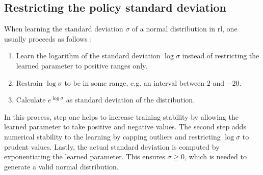 \subsection{Restricting the policy standard deviation}\label{ssec:restricting_stddev}
When learning the standard deviation $\sigma$ of a normal distribution in \gls{rl}, one usually proceeds as follows \cite{schulmanTrustRegionPolicy2017, raffinStableBaselines32019}:
\begin{enumerate}
    \item Learn the logarithm of the standard deviation $\log \sigma$ instead of restricting the learned parameter to positive ranges only.
    \item Restrain $\log \sigma$ to be in some range, e.g. an interval between $2$ and $-20$.
    \item Calculate $e^{\log \sigma}$ as standard deviation of the distribution.
\end{enumerate}
In this process, step one helps to increase training stability by allowing the learned parameter to take positive and negative values. The second step adds numerical stability to the learning by capping outliers and restricting $\log \sigma$ to prudent values. Lastly, the actual standard deviation is computed by exponentiating the learned parameter. This ensures $\sigma \geq 0$, which is needed to generate a valid normal distribution.

